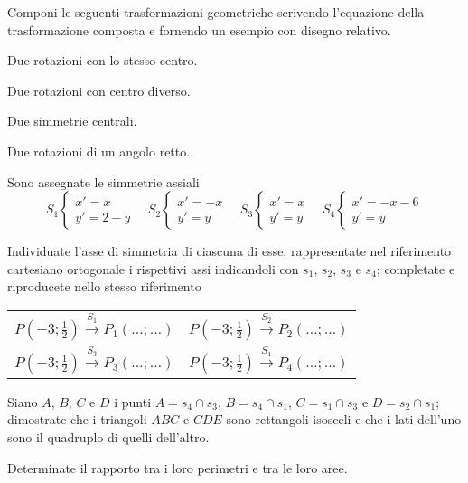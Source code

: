 \begin{esercizio}
\label{ese:8.100} %
Componi le seguenti trasformazioni geometriche scrivendo l'equazione della trasformazione composta e fornendo un esempio con disegno relativo. 
\begin{enumeratea}
\item Due rotazioni con lo stesso centro.
\item Due rotazioni con centro diverso.
\item Due simmetrie centrali.
\item Due rotazioni di un angolo retto.
\end{enumeratea}
\end{esercizio}

\begin{esercizio}
\label{ese:8.101} %
Sono assegnate le simmetrie assiali
\[S_1 \begin{cases}x'=x\\y'=2-y\end{cases}\quad  S_2 \begin{cases}x'=-x\\y'=y\end{cases}\quad S_3 \begin{cases}x'=x\\y'=y\end{cases}\quad S_4 \begin{cases}x'=-x-6\\y'=y\end{cases}\]
\begin{enumeratea}
\item Individuate l'asse di simmetria di ciascuna di esse, rappresentate nel riferimento cartesiano ortogonale i rispettivi assi indicandoli con $s_1$, $s_2$, $s_3$ e $s_4$; completate e riproducete nello stesso riferimento

\begin{center}
\begin{tabular}{cc}
$P\left(-3;\frac{1}{2}\right)\overset{S_1}\longrightarrow P_1(\ldots{};\ldots{})$ & $P\left(-3;\frac{1}{2}\right)\overset{S_2}\longrightarrow P_2(\ldots{};\ldots{})$\\
$P\left(-3;\frac{1}{2}\right)\overset{S_3}\longrightarrow P_3(\ldots{};\ldots{})$ & $P\left(-3;\frac{1}{2}\right)\overset{S_4}\longrightarrow P_4(\ldots{};\ldots{})$\\
\end{tabular}
\end{center}

\item Siano $A$, $B$, $C$ e $D$ i punti $A=s_4\cap s_3$, $B=s_4\cap s_1$, $C=s_1\cap s_3$ e $D=s_2\cap s_1$; dimostrate che i triangoli $ABC$ e $CDE$ sono rettangoli isosceli e che i lati dell'uno sono il quadruplo di quelli dell'altro.
\item Determinate il rapporto tra i loro perimetri e tra le loro aree.
\end{enumeratea}
\end{esercizio}

